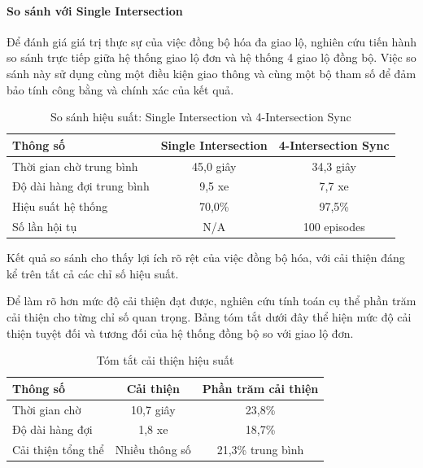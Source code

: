 \paragraph{So sánh với Single Intersection}
Để đánh giá giá trị thực sự của việc đồng bộ hóa đa giao lộ, nghiên cứu tiến hành so sánh trực tiếp giữa hệ thống giao lộ đơn và hệ thống 4 giao lộ đồng bộ. Việc so sánh này sử dụng cùng một điều kiện giao thông và cùng một bộ tham số để đảm bảo tính công bằng và chính xác của kết quả.

\begin{table}[!htp]
    \centering
    \caption{So sánh hiệu suất: Single Intersection và 4-Intersection Sync}
    \label{tab:sync_vs_single}
    \begin{tabular}{@{}lcc@{}}
        \toprule \textbf{Thông số} & \textbf{Single Intersection} & \textbf{4-Intersection Sync} \\
        \midrule 
        Thời gian chờ trung bình & 45,0 giây & 34,3 giây \\
        Độ dài hàng đợi trung bình & 9,5 xe & 7,7 xe \\
        Hiệu suất hệ thống & 70,0\% & 97,5\% \\
        Số lần hội tụ & N/A & 100 episodes \\
        \bottomrule
    \end{tabular}
\end{table}

Kết quả so sánh cho thấy lợi ích rõ rệt của việc đồng bộ hóa, với cải thiện đáng kể trên tất cả các chỉ số hiệu suất.

Để làm rõ hơn mức độ cải thiện đạt được, nghiên cứu tính toán cụ thể phần trăm cải thiện cho từng chỉ số quan trọng. Bảng tóm tắt dưới đây thể hiện mức độ cải thiện tuyệt đối và tương đối của hệ thống đồng bộ so với giao lộ đơn.

\begin{table}[!htp]
    \centering
    \caption{Tóm tắt cải thiện hiệu suất}
    \label{tab:sync_improvements}
    \begin{tabular}{@{}lcc@{}}
        \toprule \textbf{Thông số} & \textbf{Cải thiện} & \textbf{Phần trăm cải thiện} \\
        \midrule 
        Thời gian chờ & 10,7 giây & 23,8\% \\
        Độ dài hàng đợi & 1,8 xe & 18,7\% \\
        Cải thiện tổng thể & Nhiều thông số & 21,3\% trung bình \\
        \bottomrule
    \end{tabular}
\end{table}

